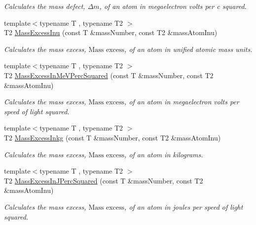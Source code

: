 \begin{DoxyCompactItemize}
\begin{DoxyCompactList}\small\item\em Calculates the mass defect, $\Delta m$, of an atom in megaelectron volts per c squared. \end{DoxyCompactList}\item 
{\footnotesize template$<$typename T , typename T2 $>$ }\\T2 \mbox{\hyperlink{group___e_g_x_phys-_mass_excess_ga61c6f557bd742126c0c76e88cf7740ad}{Mass\+Excess\+Inu}} (const T \&mass\+Number, const T2 \&mass\+Atom\+Inu)
\begin{DoxyCompactList}\small\item\em Calculates the mass excess, $\text{Mass excess}$, of an atom in unified atomic mass units. \end{DoxyCompactList}\item 
{\footnotesize template$<$typename T , typename T2 $>$ }\\T2 \mbox{\hyperlink{group___e_g_x_phys-_mass_excess_ga99a93b88df3425b7a153c32c05fa5a88}{Mass\+Excess\+In\+Me\+V\+Perc\+Squared}} (const T \&mass\+Number, const T2 \&mass\+Atom\+Inu)
\begin{DoxyCompactList}\small\item\em Calculates the mass excess, $\text{Mass excess}$, of an atom in megaelectron volts per speed of light squared. \end{DoxyCompactList}\item 
{\footnotesize template$<$typename T , typename T2 $>$ }\\T2 \mbox{\hyperlink{group___e_g_x_phys-_mass_excess_gab72a3640886092be8b9c9662020a2306}{Mass\+Excess\+Inkg}} (const T \&mass\+Number, const T2 \&mass\+Atom\+Inu)
\begin{DoxyCompactList}\small\item\em Calculates the mass excess, $\text{Mass excess}$, of an atom in kilograms. \end{DoxyCompactList}\item 
{\footnotesize template$<$typename T , typename T2 $>$ }\\T2 \mbox{\hyperlink{group___e_g_x_phys-_mass_excess_ga3eb487f438543e950b9c5aece4c5b409}{Mass\+Excess\+In\+J\+Perc\+Squared}} (const T \&mass\+Number, const T2 \&mass\+Atom\+Inu)
\begin{DoxyCompactList}\small\item\em Calculates the mass excess, $\text{Mass excess}$, of an atom in joules per speed of light squared. \end{DoxyCompactList}\item 

\end{DoxyCompactItemize}
